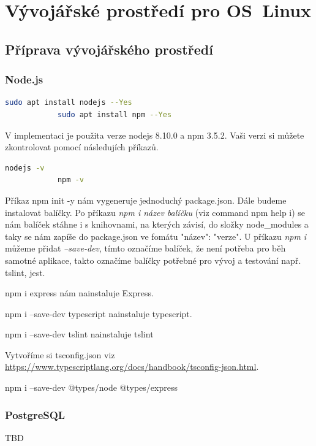 \documentclass[thesis=B,czech]{FITthesis}[2012/06/26]
\begin{document}
\chapter{Vývojářské prostředí pro OS~Linux}
    \section{Příprava vývojářského prostředí}
        \subsection{Node.js}
            \begin{lstlisting}[language=bash,caption={Instalace Node.js a npm}]
            sudo apt install nodejs --Yes
            sudo apt install npm --Yes
            \end{lstlisting}
            V implementaci je použita verze nodejs 8.10.0 a npm 3.5.2. Vaši verzi si můžete zkontrolovat pomocí následujích příkazů.
            \begin{lstlisting}[language=bash,caption={Zkontrolování verze Node.js a npm}]
            nodejs -v
            npm -v
            \end{lstlisting}

            Příkaz npm init -y nám vygeneruje jednoduchý package.json.
            Dále budeme instalovat balíčky. Po příkazu \textit{npm i název balíčku} (viz command npm help i) se nám balíček stáhne i s knihovnami, na kterých závisí, do složky node\_modules a taky se nám zapíše do package.json ve fomátu "název": "verze". U příkazu \textit{npm i} můžeme přidat \textit{--save-dev}, tímto označíme balíček, že není potřeba pro běh samotné aplikace, takto označíme balíčky potřebné pro vývoj a testování např. tslint, jest.


            npm i express nám nainstaluje Express.
            
            npm i --save-dev typescript nainstaluje typescript.
            
            npm i --save-dev tslint nainstaluje tslint
            
            Vytvoříme si tsconfig.json viz \url{https://www.typescriptlang.org/docs/handbook/tsconfig-json.html}.

            npm i --save-dev @types/node @types/express

        \subsection{PostgreSQL}
            TBD
\end{document}
